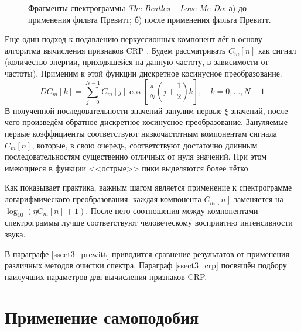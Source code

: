 \begin{figure}[htbp]
  \begin{minipage}[h]{0.49\linewidth}
  \end{minipage}
  \hfill
  \begin{minipage}[h]{0.49\linewidth}
  \end{minipage}
  \caption{Фрагменты спектрограммы \emph{The Beatles -- Love Me Do}: а)
  до применения фильта Превитт; б) после применения фильта Превитт.}
  \label{img:spectPrewitt}  
\end{figure}

Еще один подход к подавлению перкуссионных компонент лёг в основу алгоритма
вычисления признаков CRP \cite{Mueller2009}. Будем рассматривать $C_m[n]$ как
сигнал (количество энергии, приходящейся на данную частоту, в зависимости от
частоты). Применим к этой функции дискретное косинусное преобразование.
$$ DC_m[k] = \sum\limits_{j=0}^{N-1} C_m[j] \cos\left[ \frac{\pi}{N} \left(
j+\frac{1}{2} \right) k \right], \quad k=0, \ldots, N-1 $$
В полученной последовательности значений занулим первые $\xi$ значений, после
чего произведём обратное дискретное косинусное преобразование. Зануляемые первые
коэффициенты соответствуют низкочастотным компонентам сигнала $C_m[n]$, которые,
в свою очередь, соответствуют достаточно длинным последовательностям существенно
отличных от нуля значений. При этом имеющиеся в функции <<острые>> пики
выделяются более чётко.

Как показывает практика, важным шагом является применение к спектрограмме
логарифмического преобразования: каждая компонента $C_m[n]$ заменяется на
$\log_{10}(\eta C_m[n] + 1)$. После него соотношения между компонентами
спектрограммы лучше соответствуют человеческому восприятию интенсивности звука.

В параграфе \ref{ssect3_prewitt} приводится сравнение результатов от применения
различных методов очистки спектра. Параграф \ref{ssect3_crp} посвящён подбору
наилучших параметров для вычисления признаков CRP.


\section{Применение самоподобия} \label{sect1_selfsim}

